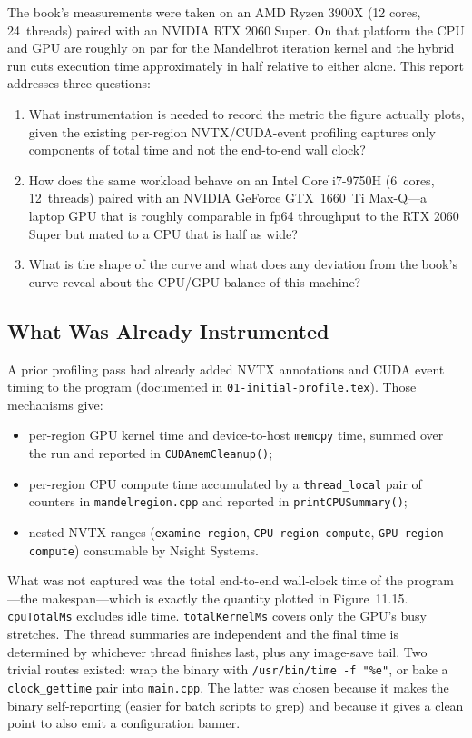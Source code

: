 \documentclass[
	english,
	letterpaper, oneside
]{article}
\begin{document}
The book's measurements were taken on an AMD Ryzen 3900X (12 cores,
24~threads) paired with an NVIDIA RTX 2060 Super. On that platform the
CPU and GPU are roughly on par for the Mandelbrot iteration kernel and
the hybrid run cuts execution time approximately in half relative to
either alone. This report addresses three questions:

\begin{enumerate}
    \item What instrumentation is needed to record the metric the figure
    actually plots, given the existing per-region NVTX/CUDA-event
    profiling captures only components of total time and not the
    end-to-end wall clock?
    \item How does the same workload behave on an Intel Core i7-9750H
    (6~cores, 12~threads) paired with an NVIDIA GeForce GTX~1660~Ti
    Max-Q---a laptop GPU that is roughly comparable in fp64 throughput
    to the RTX 2060 Super but mated to a CPU that is half as wide?
    \item What is the shape of the curve and what does any deviation
    from the book's curve reveal about the CPU/GPU balance of this
    machine?
\end{enumerate}

\subsection{What Was Already Instrumented}

A prior profiling pass had already added NVTX annotations and CUDA
event timing to the program (documented in
\texttt{01-initial-profile.tex}). Those mechanisms give:

\begin{itemize}
    \item per-region GPU kernel time and device-to-host \texttt{memcpy}
    time, summed over the run and reported in
    \texttt{CUDAmemCleanup()};
    \item per-region CPU compute time accumulated by a
    \texttt{thread\_local} pair of counters in
    \texttt{mandelregion.cpp} and reported in \texttt{printCPUSummary()};
    \item nested NVTX ranges (\texttt{examine region},
    \texttt{CPU region compute}, \texttt{GPU region compute}) consumable
    by Nsight Systems.
\end{itemize}

What was not captured was the total end-to-end wall-clock time of
the program---the makespan---which is exactly the quantity plotted in
Figure~11.15. \texttt{cpuTotalMs} excludes idle time. \texttt{totalKernelMs}
covers only the GPU's busy stretches. The thread summaries are
independent and the final time is determined by whichever thread
finishes last, plus any image-save tail. Two trivial routes existed:
wrap the binary with \texttt{/usr/bin/time -f "\%e"}, or bake a
\texttt{clock\_gettime} pair into \texttt{main.cpp}. The latter was
chosen because it makes the binary self-reporting (easier for batch
scripts to grep) and because it gives a clean point to also emit a
configuration banner.
\end{document}
